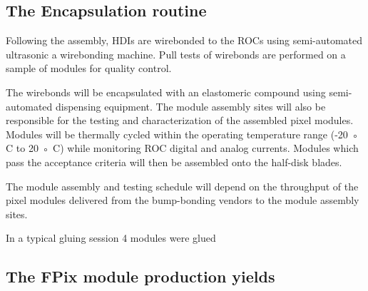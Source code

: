 \subsection{The Encapsulation routine}

Following the assembly, HDIs are wirebonded to the ROCs using semi-automated ultrasonic a wirebonding machine. Pull tests of wirebonds are performed on a sample of modules for quality control.












The
wirebonds will be encapsulated with an elastomeric compound using
semi-automated dispensing equipment. The module assembly sites will
also be responsible for the testing and characterization of the
assembled pixel modules. Modules will be thermally cycled within the
operating temperature range (-20 ◦ C to 20 ◦ C) while monitoring ROC
digital and analog currents. Modules which pass the acceptance
criteria will then be assembled onto the half-disk blades.

The module assembly and testing schedule will depend on the throughput of the pixel modules delivered from the bump-bonding vendors to the module
assembly sites.

In a typical gluing session 4 modules were glued  









\subsection{The FPix module production yields}


